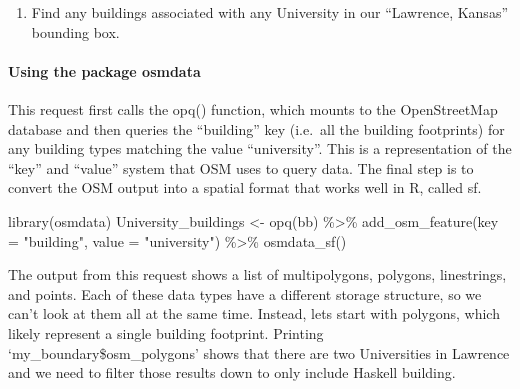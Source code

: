 \documentclass[
  paper=a4,
  ,captions=tableheading
]{scrartcl}
\newenvironment{Shaded}{\begin{snugshade}}{\end{snugshade}}
\newcommand{\AttributeTok}[1]{\textcolor[rgb]{0.77,0.63,0.00}{#1}}
\newcommand{\FunctionTok}[1]{\textcolor[rgb]{0.00,0.00,0.00}{#1}}
\newcommand{\NormalTok}[1]{#1}
\newcommand{\OtherTok}[1]{\textcolor[rgb]{0.56,0.35,0.01}{#1}}
\newcommand{\SpecialCharTok}[1]{\textcolor[rgb]{0.00,0.00,0.00}{#1}}
\newcommand{\StringTok}[1]{\textcolor[rgb]{0.31,0.60,0.02}{#1}}
\providecommand{\tightlist}{%
  \setlength{\itemsep}{0pt}\setlength{\parskip}{0pt}}
\begin{document}
\begin{enumerate}
\def\labelenumi{\arabic{enumi}.}
\setcounter{enumi}{1}
\tightlist
\item
  Find any buildings associated with any University in our ``Lawrence,
  Kansas'' bounding box.
\end{enumerate}

\hypertarget{using-the-package-osmdata}{%
\paragraph{Using the package osmdata}\label{using-the-package-osmdata}}

This request first calls the opq() function, which mounts to the
OpenStreetMap database and then queries the ``building'' key (i.e.~all
the building footprints) for any building types matching the value
``university''. This is a representation of the ``key'' and ``value''
system that OSM uses to query data. The final step is to convert the OSM
output into a spatial format that works well in R, called sf.

\begin{Shaded}
\begin{Highlighting}[]
\FunctionTok{library}\NormalTok{(osmdata)}
\NormalTok{University\_buildings }\OtherTok{\textless{}{-}} 
  \FunctionTok{opq}\NormalTok{(bb) }\SpecialCharTok{\%\textgreater{}\%} 
  \FunctionTok{add\_osm\_feature}\NormalTok{(}\AttributeTok{key =} \StringTok{"building"}\NormalTok{, }\AttributeTok{value =} \StringTok{"university"}\NormalTok{) }\SpecialCharTok{\%\textgreater{}\%} 
  \FunctionTok{osmdata\_sf}\NormalTok{()}
\end{Highlighting}
\end{Shaded}

The output from this request shows a list of multipolygons, polygons,
linestrings, and points. Each of these data types have a different
storage structure, so we can't look at them all at the same time.
Instead, lets start with polygons, which likely represent a single
building footprint. Printing `my\_boundary\$osm\_polygons' shows that
there are two Universities in Lawrence and we need to filter those
results down to only include Haskell building.

\begin{Shaded}
\end{Shaded}
\end{document}
